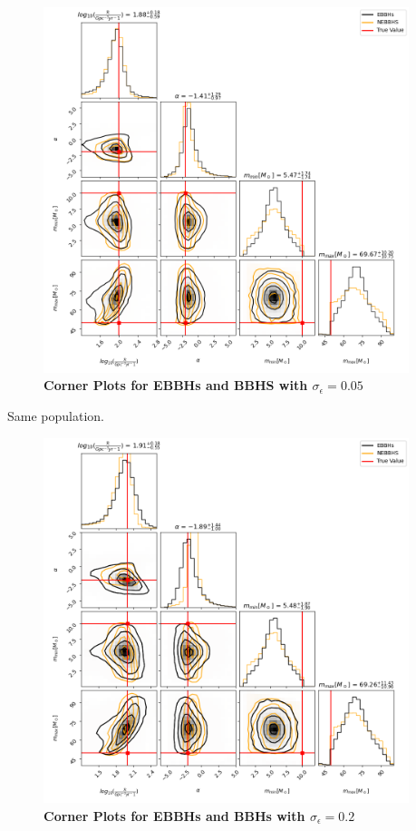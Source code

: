 \documentclass[twocolumn,prd,nofootinbib]{revtex4}
\begin{document}
\begin{figure}

\includegraphics[width=0.95\textwidth]{paper/figures/corfig_0.05.png}
\caption{\label{fig:pop3d05}\textbf{Corner Plots for EBBHs and BBHS with $\sigma_\epsilon=0.05$}}

\end{figure}
Same population.
\begin{figure}

\includegraphics[width=0.95\textwidth]{paper/figures/corfig_0.2.png}
\caption{\label{fig:pop3d05}\textbf{Corner Plots for EBBHs and BBHs with $\sigma_\epsilon=0.2$}}

\end{figure}
\end{document}
